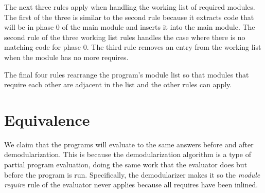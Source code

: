 The next three rules apply when handling the working list of required modules. 
The first of the three is similar to the second rule because it extracts code that will be in phase 0 of the main module and inserts it into the main module.
The second rule of the three working list rules handles the case where there is no matching code for phase 0.
The third rule removes an entry from the working list when the module has no more requires.

The final four rules rearrange the program's module list so that modules that require each other are adjacent in the list and the other rules can apply.

\section{Equivalence}

We claim that the programs will evaluate to the same answers before and after demodularization. 
This is because the demodularization algorithm is a type of partial program evaluation, doing the same work that the evaluator does but before the program is run.
Specifically, the demodularizer makes it so the \emph{module require} rule of the evaluator never applies because all requires have been inlined.

